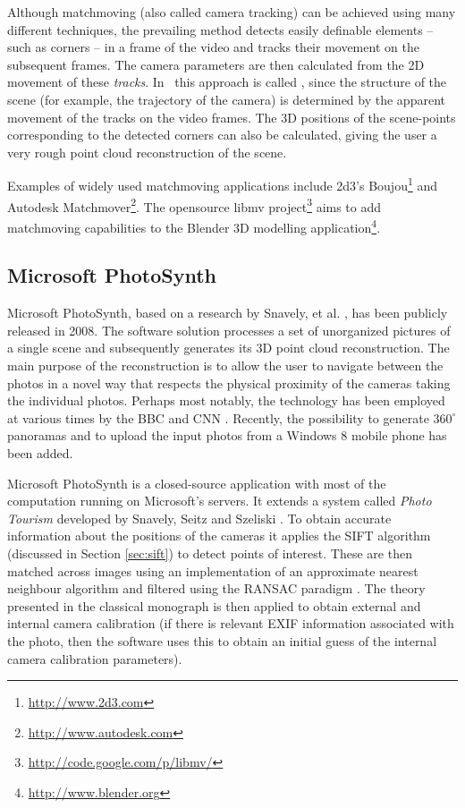 Although matchmoving (also called camera tracking) can be achieved using many different techniques, the prevailing method detects easily definable elements -- such as corners -- in a frame of the video and tracks their movement on the subsequent frames. 
The camera parameters are then calculated from the 2D movement of these {\it tracks}. 
In \cv\, this approach is called , since the structure of the scene (for example, the trajectory of the camera) is determined by the apparent movement of the tracks on the video frames.  
The 3D positions of the scene-points corresponding to the detected corners can also be calculated, giving the user a very rough point cloud reconstruction of the scene.

Examples of widely used matchmoving applications include 2d3's Boujou\footnote{\url{http://www.2d3.com}} and Autodesk Matchmover\footnote{\url{http://www.autodesk.com}}.
The opensource libmv project\footnote{\url{http://code.google.com/p/libmv/}} aims to add matchmoving capabilities to the Blender 3D modelling application\footnote{\url{http://www.blender.org}}.

\subsection{Microsoft PhotoSynth} 

Microsoft PhotoSynth, based on a research by Snavely, et al. \cite{snavely2008}, has been publicly released in 2008. 
The software solution processes a set of unorganized pictures of a single scene and subsequently generates its 3D point cloud reconstruction. 
The main purpose of the reconstruction is to allow the user to navigate between the photos in a novel way that respects the physical proximity of the cameras taking the individual photos. 
Perhaps most notably, the technology has been employed at various times by the BBC and CNN \cite{cnnsynth}. 
Recently, the possibility to generate $360^\circ$ panoramas and to upload the input photos from a Windows 8 mobile phone has been added. 

Microsoft PhotoSynth is a closed-source application with most of the computation running on Microsoft's servers. 
It extends a system called {\it Photo Tourism} developed by Snavely, Seitz and Szeliski \cite{snavely2007, snavely2006}.
To obtain accurate information about the positions of the cameras it applies the SIFT algorithm (discussed in Section \ref{sec:sift}) to detect points of interest. 
These are then matched across images using an implementation of an approximate nearest neighbour algorithm and filtered using the RANSAC paradigm \cite{ransac}.
The theory presented in the classical monograph \cite{multipleview} is then applied to obtain external and internal camera calibration (if there is relevant EXIF information associated with the photo, then the software uses this to obtain an initial guess of the internal camera calibration parameters).
 
